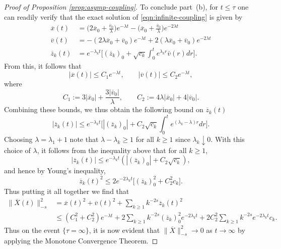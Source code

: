 \documentclass[11pt]{amsart}
\theoremstyle{definition}
\newcommand{\Xbar}{\overline{X}}
\newcommand{\xbar}{\overline{x}}
\newcommand{\vbar}{\overline{v}}
\newcommand{\zbar}{\overline{z}}
\theoremstyle{definition}
\theoremstyle{plain}
\numberwithin{equation}{section}
\begin{document}
\begin{proof}[Proof of Proposition \ref{prop:asymp-coupling}]
To conclude part~(b), for $t\leq \tau $ one can readily verify that the exact solution of \eqref{eqn:infinite-coupling} is given by 
\begin{equation*}
\begin{aligned}
\xbar(t)&=\Big(2\xbar_0+\frac{\vbar_0}{\lambda}\Big)e^{-\lambda t}-\Big(\xbar_0+\frac{\vbar_0}{\lambda}\Big)e^{-2\lambda t}\\
\vbar(t)&=-\left(2\lambda\xbar_0+\vbar_0\right)e^{-\lambda t}+2\left(\lambda\xbar_0+\vbar_0\right)e^{-2\lambda t}\\
\zbar_k(t)&=e^{-\lambda_k t}\Big[\left(\zbar_k\right)_0 +\sqrt{c_k}\int_0^t e^{\lambda_k r} \bar{v}(r) dr\Big].
\end{aligned}
\end{equation*}
From this, it follows that
\begin{equation}
\label{ineq:coupling-4}
\left|\xbar(t)\right|\leq C_1 e^{-\lambda t},\qquad \left|\vbar(t)\right|\leq C_2 e^{-\lambda t},
\end{equation}
where 
\begin{equation*} 
C_1:=3|\xbar_0|+\frac{3|\vbar_0|}{\lambda},\qquad C_2:=4\lambda|\xbar_0|+4|\vbar_0|.
\end{equation*}
Combining these bounds, we thus obtain the following bound on $\zbar_k(t)$
\begin{equation*}
\left|\zbar_k(t)\right|\leq e^{-\lambda_k t}\Big[\left|\left(\zbar_k\right)_0\right| +C_2\sqrt{c_k}\int_0^t e^{(\lambda_k-\lambda) r} dr\Big].
\end{equation*}
Choosing $\lambda=\lambda_1+1$ note that $\lambda-\lambda_k\geq 1$ for all $k\geq 1$ since $\lambda_k\downarrow 0$. With this choice of $\lambda$, it follows from the inequality above that for all $k\geq 1$,
\begin{equation}
\label{ineq:coupling-7}
\left|\zbar_k(t)\right|\leq e^{-\lambda_k t}\left(\left|\left(\zbar_k\right)_0\right| +C_2\sqrt{c_k}\right),
\end{equation}
and hence by Young's inequality,
\begin{equation*}
\zbar_k(t)^2\leq  2e^{-2\lambda_k t}\big[\left(\zbar_k\right)_0^2 +C_2^2c_k\big] .
\end{equation*}
Thus putting it all together we find that
\begin{align*}
\|\Xbar(t)\|_{-s}^2&=\xbar(t)^2+\vbar(t)^2+\sum_{k\geq 1}k^{-2s}\zbar_k(t)^2\\
&\leq \left(C_1^2+C_2^2\right)e^{-\lambda t}+2\sum_{k\geq 1}k^{-2s}\left(\zbar_k\right)_0^2e^{-2\lambda_k t}+2C_2^2\sum_{k\geq 1}k^{-2s}e^{-2\lambda_k t}c_k.
\end{align*}
Thus on the event $\{\tau=\infty\}$, it is now evident that $\|\Xbar\|_{-s}^2\to 0$ as $t\to\infty$ by applying the Monotone Convergence Theorem.


\end{proof}
\end{document}
